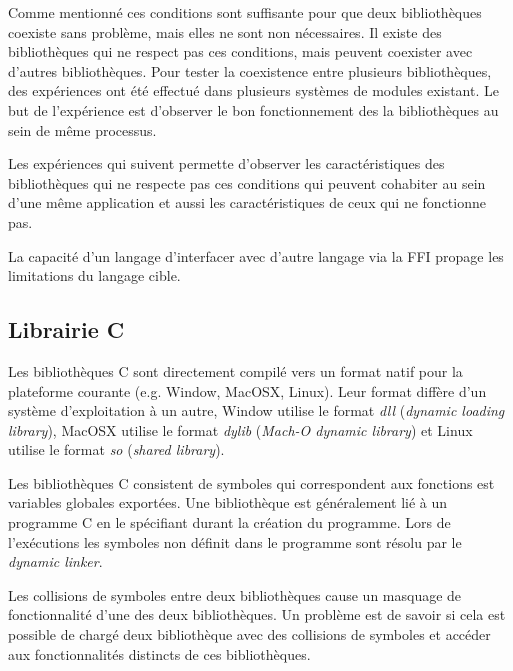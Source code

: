 \documentclass[12pt,initial,twoside,maitrise]{dms}
\numberwithin{equation}{section}
\numberwithin{table}{chapter}
\numberwithin{figure}{chapter}
\begin{document}
Comme mentionné ces conditions sont suffisante pour que deux bibliothèques coexiste sans problème,
mais elles ne sont non nécessaires. Il existe des bibliothèques
qui ne respect pas ces conditions, mais peuvent coexister avec d'autres
bibliothèques. Pour tester la coexistence entre plusieurs bibliothèques,
des expériences ont été effectué dans plusieurs systèmes de modules
existant. Le but de l'expérience est d'observer le bon fonctionnement
des la bibliothèques au sein de même processus.

Les expériences qui suivent permette d'observer
les caractéristiques des bibliothèques qui ne respecte pas ces conditions
qui peuvent cohabiter au sein d'une même application et aussi les
caractéristiques de ceux qui ne fonctionne pas.

La capacité d'un langage d'interfacer avec d'autre langage via la FFI propage
les limitations du langage cible.


\subsection{Librairie C}
Les bibliothèques C sont directement compilé vers un format natif pour la plateforme courante
(e.g. Window, MacOSX, Linux). Leur format diffère d'un système d'exploitation à un autre, Window utilise le format \textit{dll}
(\textit{dynamic loading library}), MacOSX utilise le format \textit{dylib} (\textit{Mach-O dynamic library})
et Linux utilise le format \textit{so} (\textit{shared library}).

Les bibliothèques C consistent de symboles qui correspondent aux fonctions est variables
globales exportées. Une bibliothèque est généralement lié à un programme C en le spécifiant
durant la création du programme. Lors de l'exécutions les symboles non définit dans le programme
sont résolu par le \textit{dynamic linker}.

Les collisions de symboles entre deux bibliothèques cause un masquage de
fonctionnalité d'une des deux bibliothèques. Un problème est de savoir si cela est
possible de chargé deux bibliothèque avec des collisions de symboles et accéder aux
fonctionnalités distincts de ces bibliothèques.
\end{document}

